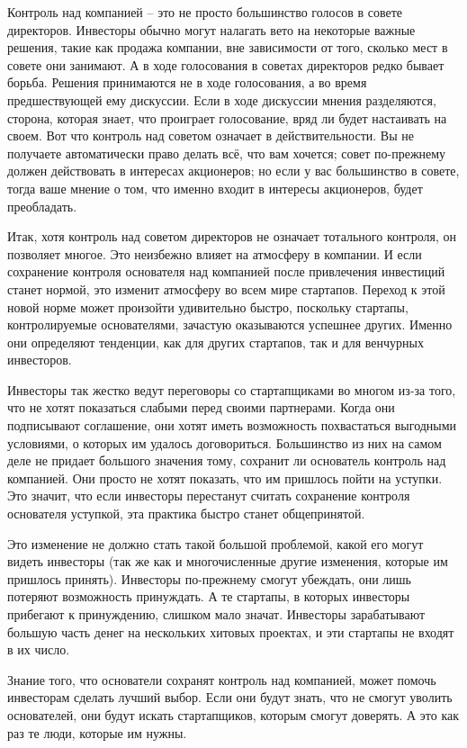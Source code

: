 \documentclass[ebook,12pt,oneside,openany]{memoir}
\begin{document}
Контроль над компанией – это не просто большинство голосов в совете
директоров. Инвесторы обычно могут налагать вето на некоторые важные
решения, такие как продажа компании, вне зависимости от того, сколько
мест в совете они занимают. А в ходе голосования в советах директоров
редко бывает борьба. Решения принимаются не в ходе голосования, а во
время предшествующей ему дискуссии. Если в ходе дискуссии мнения
разделяются, сторона, которая знает, что проиграет голосование, вряд
ли будет настаивать на своем. Вот что контроль над советом означает в
действительности. Вы не получаете автоматически право делать всё, что
вам хочется; совет по-прежнему должен действовать в интересах
акционеров; но если у вас большинство в совете, тогда ваше мнение о
том, что именно входит в интересы акционеров, будет преобладать.

Итак, хотя контроль над советом директоров не означает тотального
контроля, он позволяет многое. Это неизбежно влияет на атмосферу в
компании. И если сохранение контроля основателя над компанией после
привлечения инвестиций станет нормой, это изменит атмосферу во всем
мире стартапов. Переход к этой новой норме может произойти удивительно
быстро, поскольку стартапы, контролируемые основателями, зачастую
оказываются успешнее других. Именно они определяют тенденции, как для
других стартапов, так и для венчурных инвесторов.

Инвесторы так жестко ведут переговоры со стартапщиками во многом из-за
того, что не хотят показаться слабыми перед своими партнерами. Когда
они подписывают соглашение, они хотят иметь возможность похвастаться
выгодными условиями, о которых им удалось договориться. Большинство из
них на самом деле не придает большого значения тому, сохранит ли
основатель контроль над компанией. Они просто не хотят показать, что
им пришлось пойти на уступки. Это значит, что если инвесторы
перестанут считать сохранение контроля основателя уступкой, эта
практика быстро станет общепринятой.

Это изменение не должно стать такой большой проблемой, какой его могут
видеть инвесторы (так же как и многочисленные другие изменения,
которые им пришлось принять). Инвесторы по-прежнему смогут убеждать,
они лишь потеряют возможность принуждать. А те стартапы, в которых
инвесторы прибегают к принуждению, слишком мало значат. Инвесторы
зарабатывают большую часть денег на нескольких хитовых проектах, и эти
стартапы не входят в их число.

Знание того, что основатели сохранят контроль над компанией, может
помочь инвесторам сделать лучший выбор. Если они будут знать, что не
смогут уволить основателей, они будут искать стартапщиков, которым
смогут доверять. А это как раз те люди, которые им нужны.
\end{document}
